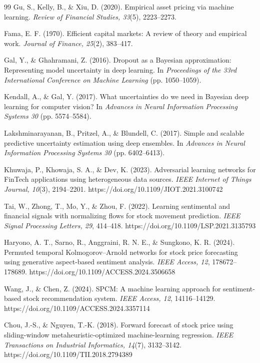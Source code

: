 \documentclass[10pt,a4paper,twocolumn]{article}
\begin{document}
\begin{thebibliography}{99}
 Gu, S., Kelly, B., \& Xiu, D. (2020). Empirical asset pricing via machine learning. \textit{Review of Financial Studies, 33}(5), 2223--2273.

 Fama, E. F. (1970). Efficient capital markets: A review of theory and empirical work. \textit{Journal of Finance, 25}(2), 383--417.

 Gal, Y., \& Ghahramani, Z. (2016). Dropout as a Bayesian approximation: Representing model uncertainty in deep learning. In \textit{Proceedings of the 33rd International Conference on Machine Learning} (pp. 1050--1059).

 Kendall, A., \& Gal, Y. (2017). What uncertainties do we need in Bayesian deep learning for computer vision? In \textit{Advances in Neural Information Processing Systems 30} (pp. 5574--5584).

 Lakshminarayanan, B., Pritzel, A., \& Blundell, C. (2017). Simple and scalable predictive uncertainty estimation using deep ensembles. In \textit{Advances in Neural Information Processing Systems 30} (pp. 6402--6413).

 Khuwaja, P., Khowaja, S. A., \& Dev, K. (2023). Adversarial learning networks for FinTech applications using heterogeneous data sources. \textit{IEEE Internet of Things Journal, 10}(3), 2194--2201. https://doi.org/10.1109/JIOT.2021.3100742

 Tai, W., Zhong, T., Mo, Y., \& Zhou, F. (2022). Learning sentimental and financial signals with normalizing flows for stock movement prediction. \textit{IEEE Signal Processing Letters, 29}, 414--418. https://doi.org/10.1109/LSP.2021.3135793

 Haryono, A. T., Sarno, R., Anggraini, R. N. E., \& Sungkono, K. R. (2024). Permuted temporal Kolmogorov--Arnold networks for stock price forecasting using generative aspect-based sentiment analysis. \textit{IEEE Access, 12}, 178672--178689. https://doi.org/10.1109/ACCESS.2024.3506658

 Wang, J., \& Chen, Z. (2024). SPCM: A machine learning approach for sentiment-based stock recommendation system. \textit{IEEE Access, 12}, 14116--14129. https://doi.org/10.1109/ACCESS.2024.3357114

 Chou, J.-S., \& Nguyen, T.-K. (2018). Forward forecast of stock price using sliding-window metaheuristic-optimized machine-learning regression. \textit{IEEE Transactions on Industrial Informatics, 14}(7), 3132--3142. https://doi.org/10.1109/TII.2018.2794389


\end{thebibliography}
\end{document}
